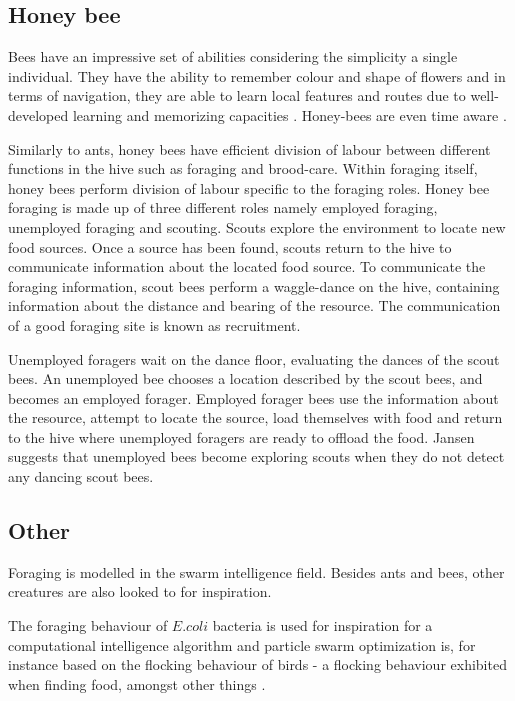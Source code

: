 \subsection{Honey bee}
\label{honeybeeinnature}
Bees have an impressive set of abilities considering the simplicity a single individual. They have the ability to remember colour and shape of flowers \cite{zhang2006honeybee} and in terms of navigation, they are able to learn local features and routes due to well-developed learning and memorizing capacities \cite{menzel2001cognitive}. Honey-bees are even time aware \cite{moore1989influence}. 

Similarly to ants, honey bees have efficient division of labour between different functions in the hive such as foraging and brood-care. Within foraging itself, honey bees perform division of labour specific to the foraging roles. Honey bee foraging is made up of three different roles \cite{seeley2009wisdom} namely employed foraging, unemployed foraging and scouting. Scouts explore the environment to locate new food sources. Once a source has been found, scouts return to the hive to communicate information about the located food source. To communicate the foraging information, scout bees perform a waggle-dance on the hive, containing information about the distance and bearing of the resource. The communication of a good foraging site is known as recruitment. 

Unemployed foragers wait on the dance floor, evaluating the dances of the scout bees. An unemployed bee chooses a location described by the scout bees, and becomes an employed forager. Employed forager bees use the information about the resource, attempt to locate the source, load themselves with food and return to the hive where unemployed foragers are ready to offload the food. Jansen \cite{janson2007searching} suggests that unemployed bees become exploring scouts when they do not detect any dancing scout bees. 

\subsection{Other}
\label{otherforaginginspirations}
Foraging is modelled in the swarm intelligence field. Besides ants and bees, other creatures are also looked to for inspiration.

The foraging behaviour of $E. coli$ bacteria is used for inspiration for a computational intelligence algorithm \cite{passino2010bacterial} and particle swarm optimization is, for instance based on the flocking behaviour of birds - a flocking behaviour exhibited when finding food, amongst other things \cite{kennedy1995particle}. 

